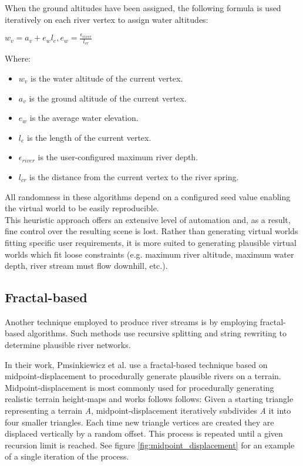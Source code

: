 When the ground altitudes have been assigned, the following formula is used iteratively on each river vertex to assign water altitudes:

\begin{center}
$w_{v} = a_{v} + e_{w}l_{e}, e_{w} = \frac{\epsilon_{river}}{l_{cr}} $
\end{center}

Where:
\begin{itemize}
\item $w_{v}$ is the water altitude of the current vertex.
\item $a_{v}$ is the ground altitude of the current vertex.
\item $e_{w}$ is the average water elevation.
\item $l_{e}$ is the length of the current vertex.
\item $\epsilon_{river}$ is the user-configured maximum river depth.
\item $l_{cr}$ is the distance from the current vertex to the river spring.
\end{itemize}

All randomness in these algorithms depend on a configured seed value enabling the virtual world to be easily reproducible.  \\

This heuristic approach offers an extensive level of automation and, as a result, fine control over the resulting scene is lost. Rather than generating virtual worlds fitting specific user requirements, it is more suited to generating plausible virtual worlds which fit loose constraints (e.g. maximum river altitude, maximum water depth, river stream must flow downhill, etc.). 

\subsection{Fractal-based}

Another technique employed to produce river streams is by employing fractal-based algorithms. Such methods use recursive splitting and string rewriting to determine plausible river networks. 

In their work, Pmsinkiewicz et al. use a fractal-based technique based on midpoint-displacement to procedurally generate plausible rivers on a terrain. Midpoint-displacement is most commonly used for procedurally generating realistic terrain height-maps and works follows follows: Given a starting triangle representing a terrain \textit{A}, midpoint-displacement iteratively subdivides \textit{A} it into four smaller triangles. Each time new triangle vertices are created they are displaced vertically by a random offset. This process is repeated until a given recursion limit is reached. See figure \ref{fig:midpoint_displacement} for an example of a single iteration of the process.


